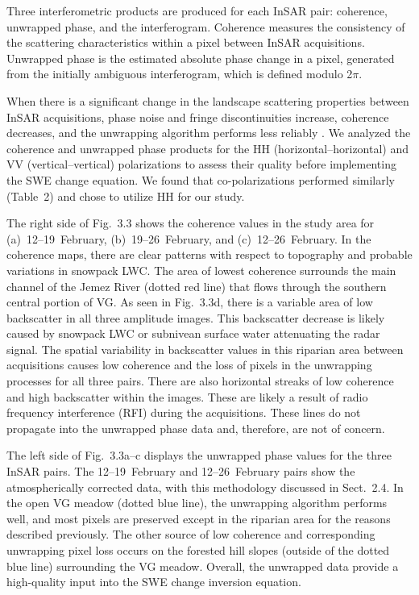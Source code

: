 Three interferometric products are produced for each InSAR pair: coherence, unwrapped phase, and the interferogram. Coherence measures the consistency of the scattering characteristics within a pixel between InSAR acquisitions. Unwrapped phase is the estimated absolute phase change in a pixel, generated from the initially ambiguous interferogram, which is defined modulo 2$\pi$.

When there is a significant change in the landscape scattering properties between InSAR acquisitions, phase noise and fringe discontinuities increase, coherence decreases, and the unwrapping algorithm performs less reliably \citep{balzterForestMappingMonitoring2001}. We analyzed the coherence and unwrapped phase products for the HH (horizontal--horizontal) and VV (vertical--vertical) polarizations to assess their quality before implementing the SWE change equation. We found that co-polarizations performed similarly (Table~2) and chose to utilize HH for our study.

The right side of Fig.~3.3 shows the coherence values in the study area for (a)~12--19~February, (b)~19--26~February, and (c)~12--26~February. In the coherence maps, there are clear patterns with respect to topography and probable variations in snowpack LWC. The area of lowest coherence surrounds the main channel of the Jemez River (dotted red line) that flows through the southern central portion of VG. As seen in Fig.~3.3d, there is a variable area of low backscatter in all three amplitude images. This backscatter decrease is likely caused by snowpack LWC or subnivean surface water attenuating the radar signal. The spatial variability in backscatter values in this riparian area between acquisitions causes low coherence and the loss of pixels in the unwrapping processes for all three pairs. There are also horizontal streaks of low coherence and high backscatter within the images. These are likely a result of radio frequency interference (RFI) during the acquisitions. These lines do not propagate into the unwrapped phase data and, therefore, are not of concern.

The left side of Fig.~3.3a--c displays the unwrapped phase values for the three InSAR pairs. The 12--19~February and 12--26~February pairs show the atmospherically corrected data, with this methodology discussed in Sect.~2.4. In the open VG meadow (dotted blue line), the unwrapping algorithm performs well, and most pixels are preserved except in the riparian area for the reasons described previously. The other source of low coherence and corresponding unwrapping pixel loss occurs on the forested hill slopes (outside of the dotted blue line) surrounding the VG meadow. Overall, the unwrapped data provide a high-quality input into the SWE change inversion equation.

